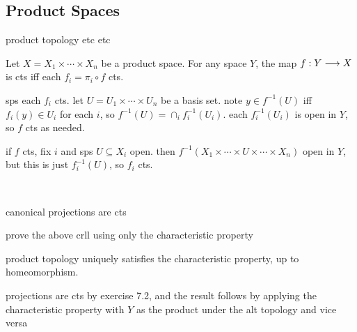 \subsection{Product Spaces}
product topology etc etc

\begin{prop}[type=Theorem,title=Characteristic Property of the Product Topology]
    Let $ X = X_{1}\times \cdots \times X_{n} $ be a product space. For any space
    $ Y $, the map $ f:Y \longrightarrow X $ is cts iff each $ f_{i} = \pi_{i}\circ f $ cts.
\end{prop}

\begin{pf}[source=Primary Source Material]
    sps each $ f_{i} $ cts. let $ U = U_{1}\times\cdots\times U_{n} $ be a basis
    set. note $ y \in f^{-1}(U) $ iff $ f_{i}(y)\in U_{i} $ for each $ i $, so
    $ f^{-1}(U) = \cap_{i}f_{i}^{-1}(U_{i}) $. each $ f_{i}^{-1}(U_{i}) $ is open
    in $ Y $, so $ f $ cts as needed.

    if $ f $ cts, fix $ i $ and sps $ U \subseteq X_{i} $ open. then
    $ f^{-1}(X_{1}\times\cdots\times U \times\cdots\times X_{n}) $ open in $ Y $,
    but this is just $ f_{i}^{-1}(U) $, so $ f_{i} $ cts.
\end{pf} \

\begin{crll}
    canonical projections are cts
\end{crll}

\newpage
\begin{exr}[source=Primary Source Material]
    prove the above crll using only the characteristic property
\end{exr}

\begin{prop}
    product topology uniquely satisfies the characteristic property, up to
    homeomorphism.
\end{prop}

\begin{pf}[source=Primary Source Material]
    projections are cts by exercise 7.2, and the result follows by applying the
    characteristic property with $ Y $ as the product under the alt topology and
    vice versa
\end{pf}

